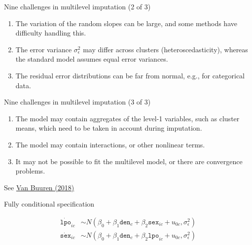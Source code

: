 \documentclass[ignorenonframetext,aspectratio=43]{beamer}
\begin{document}
\begin{frame}{Nine challenges in multilevel imputation (2 of 3)}

\begin{enumerate}
\def\labelenumi{\arabic{enumi}.}
\setcounter{enumi}{3}
\item
  The variation of the random slopes can be large, and some methods have
  difficulty handling this.
\item
  The error variance \(\sigma_\epsilon^2\) may differ across clusters
  (heteroscedasticity), whereas the standard model assumes equal error
  variances.
\item
  The residual error distributions can be far from normal, e.g., for
  categorical data.
\end{enumerate}

\end{frame}

\begin{frame}{Nine challenges in multilevel imputation (3 of 3)}

\begin{enumerate}
\def\labelenumi{\arabic{enumi}.}
\setcounter{enumi}{6}
\item
  The model may contain aggregates of the level-1 variables, such as
  cluster means, which need to be taken in account during imputation.
\item
  The model may contain interactions, or other nonlinear terms.
\item
  It may not be possible to fit the multilevel model, or there are
  convergence problems.
\end{enumerate}

See \href{https://stefvanbuuren.name/fimd/sec-missmult.html}{Van Buuren
(2018)}

\end{frame}

\begin{frame}{Fully conditional specification}

\begin{align}
\dot{{\texttt{lpo}}}_{ic} & \sim N(\beta_0 + \beta_1 {{\texttt{den}}}_{c} + \beta_2 {{\texttt{sex}}}_{ic} + u_{0c}, \sigma_\epsilon^2)\\
\dot{{\texttt{sex}}}_{ic} & \sim N(\beta_0 + \beta_1 {{\texttt{den}}}_{c} + \beta_2 {{\texttt{lpo}}}_{ic} + u_{0c}, \sigma_\epsilon^2)
\end{align}

\end{frame}
\end{document}

